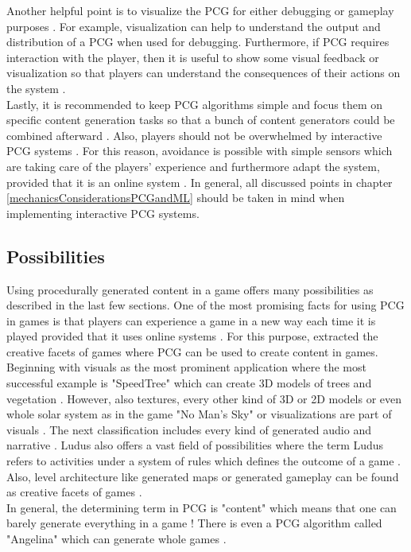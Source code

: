 \documentclass[MGS,Master,english]{twbook}%
\begin{document}
Another helpful point is to visualize the PCG for either debugging or gameplay purposes \cite{pcg::book}. For example, visualization can help to understand the output and distribution of a PCG when used for debugging. Furthermore, if PCG requires interaction with the player, then it is useful to show some visual feedback or visualization so that players can understand the consequences of their actions on the system \cite{pcg::endlessWeb}. \\
Lastly, it is recommended to keep PCG algorithms simple and focus them on specific content generation tasks so that a bunch of content generators could be combined afterward \cite{pcg::book}.  Also, players should not be overwhelmed by interactive PCG systems \cite{pcg::shortHistoryOfDynamicAndPCG}. For this reason, avoidance is possible with simple sensors which are taking care of the players' experience and furthermore adapt the system, provided that it is an online system \cite{pcg::shortHistoryOfDynamicAndPCG}.  In general, all discussed points in chapter \ref{mechanicsConsiderationsPCGandML} should be taken in mind when implementing interactive PCG systems.

\subsection{Possibilities}
Using procedurally generated content in a game offers many possibilities as described in the last few sections. One of the most promising facts for using PCG in games is that players can experience a game in a new way each time it is played provided that it uses online systems \cite{pcg::gamasutra::tips}. For this purpose, \cite{pcg::computationalGameCreativity} extracted the creative facets of games where PCG can be used to create content in games. Beginning with visuals as the most prominent application where the most successful example is "SpeedTree" \cite{speedTree} which can create \ac{3D} models of trees and vegetation \cite{pcg::computationalGameCreativity}. However, also textures, every other kind of 3D or \ac{2D} models or even whole solar system as in the game "No Man's Sky" \cite{game::noMansSky} or visualizations are part of visuals \cite{pcg::computationalGameCreativity}. The next classification includes every kind of generated audio and narrative \cite{pcg::computationalGameCreativity}. Ludus also offers a vast field of possibilities where the term Ludus refers to activities under a system of rules which defines the outcome of a game \cite{pcg::computationalGameCreativity}. Also, level architecture like generated maps or generated gameplay can be found as creative facets of games \cite{pcg::computationalGameCreativity}.\\
In general, the determining term in PCG is "content" which means that one can barely generate everything in a game \cite{pcg::book}! There is even a PCG algorithm called "Angelina" which can generate whole games \cite{pcg::angelina}.
\end{document}
